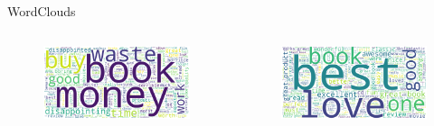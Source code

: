 \documentclass{beamer}
\theoremstyle{definition}
\theoremstyle{plain}
\begin{document}
\begin{frame}{WordClouds}
{\begin{columns}
    \begin{figure}
        \centering
        \includegraphics[scale=0.12, trim= 0 0 0 0cm]{Figures/wordcloud_title1.1.png}
    \end{figure}

    \begin{figure}
        \centering
        \includegraphics[scale=0.12]{Figures/wordcloud_title1.2.png}
    \end{figure}
\end{columns}
}
\end{frame}
\end{document}
